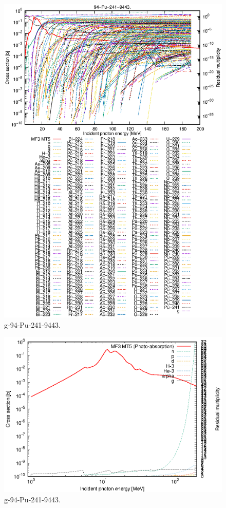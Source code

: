 \begin{figure}
 \includegraphics[width=\linewidth]{eps/g_94-Pu-241_9443.eps}
  \caption{g-94-Pu-241-9443.}
\end{figure}
\newpage \clearpage

\begin{figure}
 \includegraphics[width=\linewidth]{eps-log/g_94-Pu-241_9443.eps}
 \caption{g-94-Pu-241-9443.}
\end{figure}
\newpage \clearpage

